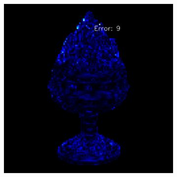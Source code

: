 \begin{figure}
\begin{subfigure}[b]{0.24\linewidth}
	\end{subfigure}
	\begin{subfigure}[b]{0.24\linewidth}
		\includegraphics[width=\linewidth]{./Figures/gcnn_synthetic/fancy_eval_2_error_an2-8-1000.png}
	\end{subfigure}
	
	
	

\end{figure}
